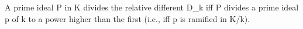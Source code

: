A prime ideal P in K divides the relative different D_k iff P divides a prime ideal p of k to a power higher than the first (i.e., iff p is ramified in K/k).
